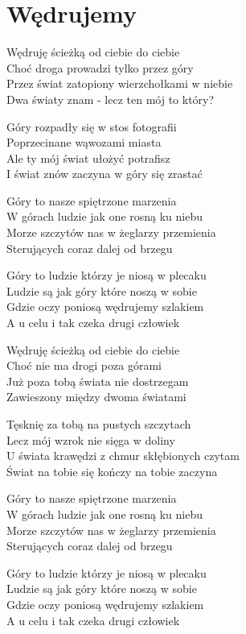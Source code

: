 \section{Wędrujemy}
\begin{text}
Wędruję ścieżką od ciebie do ciebie\\
Choć droga prowadzi tylko przez góry\\
Przez świat zatopiony wierzchołkami w niebie\\
Dwa światy znam - lecz ten mój to który?

Góry rozpadły się w stos fotografii\\
Poprzecinane wąwozami miasta\\
Ale ty mój świat ułożyć potrafisz\\
I świat znów zaczyna w góry się zrastać

Góry to nasze spiętrzone marzenia\\
W górach ludzie jak one rosną ku niebu\\
Morze szczytów nas w żeglarzy przemienia\\
Sterujących coraz dalej od brzegu

Góry to ludzie którzy je niosą w plecaku\\
Ludzie są jak góry które noszą w sobie\\
Gdzie oczy poniosą wędrujemy szlakiem\\
A u celu i tak czeka drugi człowiek

Wędruję ścieżką od ciebie do ciebie\\
Choć nie ma drogi poza górami\\
Już poza tobą świata nie dostrzegam\\
Zawieszony między dwoma światami

Tęsknię za tobą na pustych szczytach\\
Lecz mój wzrok nie sięga w doliny\\
U świata krawędzi z chmur skłębionych czytam\\
Świat na tobie się kończy na tobie zaczyna

Góry to nasze spiętrzone marzenia\\
W górach ludzie jak one rosną ku niebu\\
Morze szczytów nas w żeglarzy przemienia\\
Sterujących coraz dalej od brzegu

Góry to ludzie którzy je niosą w plecaku\\
Ludzie są jak góry które noszą w sobie\\
Gdzie oczy poniosą wędrujemy szlakiem\\
A u celu i tak czeka drugi człowiek
\end{text}
